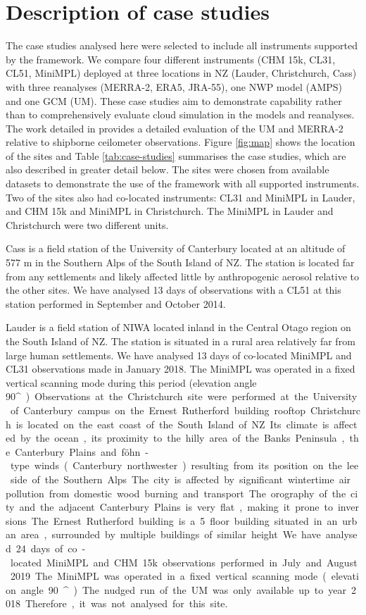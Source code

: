 \section{Description of case studies}
\label{sec:case-studies}

The case studies analysed here were selected
to include all instruments supported by the framework. We compare four different
instruments (CHM 15k, CL31, CL51, MiniMPL) deployed at three locations in NZ
(Lauder, Christchurch, Cass) with three reanalyses (MERRA-2, ERA5, JRA-55),
one NWP model (AMPS) and one GCM (UM).
These case studies aim to demonstrate capability rather than to comprehensively evaluate cloud simulation in the
models and reanalyses. The work detailed in \cite{kuma2019} provides a detailed evaluation of the UM and MERRA-2 relative to shipborne ceilometer observations.
Figure \ref{fig:map} shows the location of the sites and Table \ref{tab:case-studies}
summarises the case studies, which are also described in greater detail below.
The sites were chosen from available datasets to demonstrate the use of the
framework with all supported instruments. Two of the sites also had co-located
instruments: CL31 and MiniMPL in Lauder, and CHM 15k and MiniMPL in
Christchurch. The MiniMPL in Lauder and Christchurch were two different units.

Cass is a field station of the University of Canterbury
located at an altitude of 577 m in the Southern Alps
of the South Island of NZ. The station is located far from any 
settlements and likely affected little by anthropogenic aerosol relative to the
other sites. We have analysed
13 days of observations with a CL51 at this station performed in September
and October 2014.

Lauder is a field station of NIWA located
inland in the Central Otago region on the South Island of NZ.
The station is situated in a rural area relatively far from large human
settlements. We have analysed 13 days of co-located MiniMPL and CL31
observations made in January 2018. The MiniMPL was operated in a fixed
vertical scanning mode during this period (elevation angle 90\unit{^\circ}).

Observations at the Christchurch site were performed at the
University of Canterbury campus on the Ernest Rutherford building rooftop.
Christchurch is located on the east coast of the South Island of NZ.
Its climate is affected by the ocean, its proximity to the hilly area
of the Banks Peninsula, the Canterbury Plains and föhn-type winds (Canterbury northwester)
resulting from its position on the lee side of the Southern Alps. The city is affected by
significant wintertime air pollution from domestic wood burning and transport.
The orography of the city and the adjacent Canterbury Plains is very flat,
making it prone to inversions. The Ernest Rutherford building is a 5 floor
building situated in an urban area, surrounded by multiple buildings of similar
height. We have analysed 24 days of co-located MiniMPL and CHM 15k observations
performed in July and August 2019. The MiniMPL was operated in a fixed vertical
scanning mode (elevation angle 90\unit{^\circ}).
The nudged run of the UM was only available up to year 2018. Therefore,
it was not analysed for this site.

